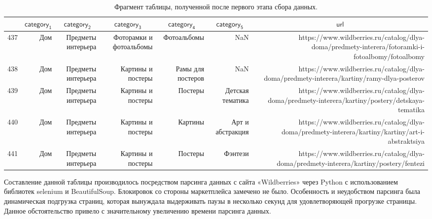 \documentclass[a4paper,12pt]{extarticle}
\begin{document}
\begin{table}[ht]
\caption{Фрагмент таблицы, полученной после первого этапа сбора данных.}
\label{table:datastatistic0}
\footnotesize
\centering
	\begin{tabular}{lrrrrrr}
		\toprule
		{} & \multicolumn{1}{c}{$\mathsf{category_1}$} &\multicolumn{1}{c}{$\mathsf{category_2}$} &  \multicolumn{1}{c}{$\mathsf{category_3}$} & \multicolumn{1}{c}{$\mathsf{category_4}$} &  \multicolumn{1}{c}{$\mathsf{category_5}$} & \multicolumn{1}{c}{$\mathsf{url}$}\\
		\midrule
		437 & Дом & Предметы интерьера & Фоторамки и фотоальбомы & Фотоальбомы       & NaN              & https://www.wildberries.ru/catalog/dlya-doma/predmety-interera/fotoramki-i-fotoalbomy/fotoalbomy\\
		438 & Дом & Предметы интерьера & Картины и постеры       & Рамы для постеров & NaN              & https://www.wildberries.ru/catalog/dlya-doma/predmety-interera/kartiny/ramy-dlya-posterov\\
		439 & Дом & Предметы интерьера & Картины и постеры       & Постеры           & Детская тематика & https://www.wildberries.ru/catalog/dlya-doma/predmety-interera/kartiny/postery/detskaya-tematika\\
		440 & Дом & Предметы интерьера & Картины и постеры       & Картины           & Арт и абстракция & https://www.wildberries.ru/catalog/dlya-doma/predmety-interera/kartiny/kartiny/art-i-abstraktsiya\\
		441 & Дом & Предметы интерьера & Картины и постеры       & Постеры           & Фэнтези          & https://www.wildberries.ru/catalog/dlya-doma/predmety-interera/kartiny/postery/fentezi\\
		\bottomrule
	\end{tabular}
\end{table}

Составление данной таблицы производилось посредством парсинга данных с сайта «Wildberries» через Python с использованием библиотек selenium и BeautifulSoup. Блокировок со стороны маркетплейса замечено не было. Особенность и неудобством парсинга была динамическая подгрузка страниц, которая вынуждала выдерживать паузы в несколько секунд для удовлетворяющей прогрузке страницы. Данное обстоятельство привело с значительному увеличению времени парсинга данных.
\end{document}
